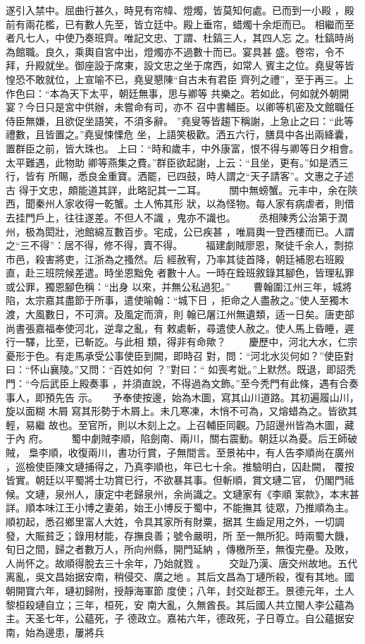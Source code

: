 \documentclass{ctexart}
\begin{document}
遂引入禁中。屈曲行甚久，時見有帘幃、燈燭，皆莫知何處。已而到一小殿 ，殿前有兩花檻，已有數人先至，皆立廷中。殿上垂帘，蜡燭十余炬而已。 相繼而至者凡七人，中使乃奏班齊。唯記文忠、丁謂、杜鎬三人，其四人忘 之。杜鎬時尚為館職。良久，乘輿自宮中出，燈燭亦不過數十而已。宴具甚 盛。卷帘，令不拜，升殿就坐。御座設于席東，設文忠之坐于席西，如常人 賓主之位。堯叟等皆惶恐不敢就位，上宣喻不已，堯叟懇陳``自古未有君臣 齊列之禮''，至于再三。上作色曰：``本為天下太平，朝廷無事，思与卿等 共樂之。若如此，何如就外朝開宴？今日只是宮中供辦，未嘗命有司，亦不 召中書輔臣。以卿等机密及文館職任侍臣無嫌，且欲促坐語笑，不須多辭。 ''堯叟等皆趨下稱謝，上急止之曰：``此等禮數，且皆置之。''堯叟悚慄危 坐，上語笑极歡。洒五六行，膳具中各出兩絳囊，置群臣之前，皆大珠也。 上曰：``時和歲丰，中外康富，恨不得与卿等日夕相會。太平難遇，此物助 卿等燕集之費。''群臣欲起謝，上云：``且坐，更有。''如是洒三行，皆有 所賜，悉良金重寶。洒罷，已四鼓，時人謂之``天子請客''。文惠之子述古 得于文忠，頗能道其詳，此略記其一二耳。 　　關中無螃蟹。元丰中，余在陝西，聞秦州人家收得一乾蟹。土人怖其形 狀，以為怪物。每人家有病虐者，則借去挂門戶上，往往遂差。不但人不識 ，鬼亦不識也。 　　丞相陳秀公治第于潤州，极為閎壯，池館綿亙數百步。宅成，公已疾甚 ，唯肩輿一登西樓而已。人謂之``三不得''：居不得，修不得，賣不得。 　　福建劇賊廖恩，聚徒千余人，剽掠市邑，殺害將吏，江浙為之搔然。后 經赦宥，乃率其徒首降，朝廷補恩右班殿直，赴三班院候差遣。時坐恩黜免 者數十人。一時在銓班敘錄其腳色，皆理私罪或公罪，獨恩腳色稱：``出身 以來，并無公私過犯。'' 　　曹翰圍江州三年，城將陷，太宗嘉其盡節于所事，遣使喻翰：``城下日 ，拒命之人盡赦之。''使人至獨木渡，大風數日，不可濟。及風定而濟，則 翰已屠江州無遺類，适一日矣。唐吏部尚書張嘉福奉使河北，逆韋之亂，有 敕處斬，尋遣使人赦之。使人馬上昏睡，遲行一驛，比至，已斬訖。与此相 類，得非有命歟？ 　　慶歷中，河北大水，仁宗憂形于色。有走馬承受公事使臣到闕，即時召 對，問：``河北水災何如？''使臣對曰：``怀山襄陵。''又問：``百姓如何 ？''對曰：`` 如喪考妣。''上默然。既退，即詔秃門：``今后武臣上殿奏事 ，并須直說，不得過為文飾。''至今秃門有此條，遇有合奏事人，即預先告 示。　　予奉使按邊，始為木圖，寫其山川道路。其初遍履山川，旋以面糊 木屑 寫其形勢于木屑上。未几寒凍，木悄不可為，又熔蜡為之。皆欲其輕，易繼 故也。至官所，則以木刻上之。上召輔臣同觀。乃詔邊州皆為木圖，藏于內 府。 　　蜀中劇賊李順，陷劍南、兩川，關右震動。朝廷以為憂。后王師破賊， 梟李順，收復兩川，書功行賞，子無間言。至景祐中，有人告李順尚在廣州 ，巡檢使臣陳文璉捕得之，乃真李順也，年已七十余。推驗明白，囚赴闕， 覆按皆實。朝廷以平蜀將士功賞已行，不欲暴其事。但斬順，賞文璉二官， 仍閣門祗候。文璉，泉州人，康定中老歸泉州，余尚識之。文璉家有《李順 案款》，本末甚詳。順本味江王小博之妻弟，始王小博反于蜀中，不能撫其 徒眾，乃推順為主。順初起，悉召鄉里富人大姓，令具其家所有財粟，据其 生齒足用之外，一切調發，大賑貧乏；錄用材能，存撫良善；號令嚴明，所 至一無所犯。時兩蜀大饑，旬日之間，歸之者數万人，所向州縣，開門延納 ，傳檄所至，無復完壘。及敗，人尚怀之。故順得脫去三十余年，乃始就戮 。 　　交趾乃漢、唐交州故地。五代离亂，吳文昌始据安南，稍侵交、廣之地 。其后文昌為丁璉所殺，復有其地。國朝開寶六年，璉初歸附，授靜海軍節 度使；八年，封交趾郡王。景德元年，土人黎桓殺璉自立；三年，桓死，安 南大亂，久無酋長。其后國人共立閩人李公蘊為主。天圣七年，公蘊死，子 德政立。嘉祐六年，德政死，子日尊立。自公蘊据安南，始為邊患，屢將兵 
\end{document}
